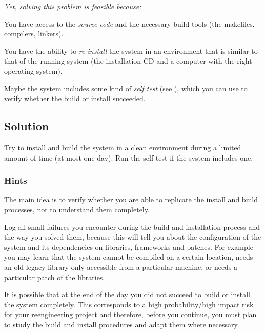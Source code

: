 \documentclass[a4paper,10pt,twoside]{book}
\begin{document}
\emph{Yet, solving this problem is feasible because:}

\begin{bulletlist}
  \item You have access to the \emph{source code} and the necessary build tools (\ie the makefiles, compilers, linkers).

  \item You have the ability to \emph{re-install} the system in an environment that is similar to that of the running system (\ie the installation CD and a computer with the right operating system).

  \item Maybe the system includes some kind of \emph{self test} (see ), which you can use to verify whether the build or install succeeded.
\end{bulletlist}

\subsection*{Solution}

Try to install and build the system in a clean environment during a limited amount of time (at most one day). Run the self test if the system includes one. 

\subsubsection*{Hints}

The main idea is to verify whether you are able to replicate the install and build processes, not to understand them completely.

Log all small failures you encounter during the build and installation process and the way you solved them, because this will tell you about the configuration of the system and its dependencies on libraries, frameworks and patches. For example you may learn that the system cannot be compiled on a certain location, needs an old legacy library only accessible from a particular machine, or needs a particular patch of the libraries.

It is possible that at the end of the day you did not succeed to build or install the system completely. This corresponds to a high probability/high impact risk for your reengineering project and therefore, before you continue, you must plan to study the build and install procedures and adapt them where necessary.
\end{document}
